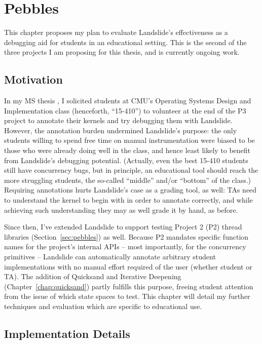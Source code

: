 \chapter{Pebbles}
\label{chap:410}

This chapter proposes my plan to evaluate Landslide's effectiveness as a debugging aid for students in an educational setting.
This is the second of the three projects I am proposing for this thesis, and is currently ongoing work.

\section{Motivation}

In my MS thesis \cite{landslide}, I solicited students at CMU's Operating Systems Design and Implementation class
(henceforth, ``15-410'')
to volunteer at the end of the P3 project to annotate their kernels and try debugging them with Landslide.
However, the annotation burden undermined Landslide's purpose:
the only students willing to spend free time on manual instrumentation were biased to be those who were already doing well in the class,
and hence least likely to benefit from Landslide's debugging potential.
(Actually, even the best 15-410 students still have concurrency bugs,
but in principle, an educational tool should reach the more struggling students,
the so-called ``middle'' and/or ``bottom'' of the class.)
%
Requiring annotations hurts Landslide's case as a grading tool, as well:
TAs need to understand the kernel to begin with in order to annotate correctly,
and while achieving such understanding they may as well grade it by hand, as before.

Since then, I've extended Landslide to support testing Project 2 (P2) thread libraries (Section~\ref{sec:pebbles}) as well.
Because P2 mandates specific function names for the project's internal APIs
-- most importantly, for the concurrency primitives --
Landslide can automatically annotate arbitrary student implementations with no manual effort required of the user (whether student or TA).
The addition of Quicksand and Iterative Deepening (Chapter~\ref{chap:quicksand}) partly fulfills this purpose,
freeing student attention from the issue of which state spaces to test.
This chapter will detail my further techniques and evaluation which are specific to educational use.

\section{Implementation Details}

